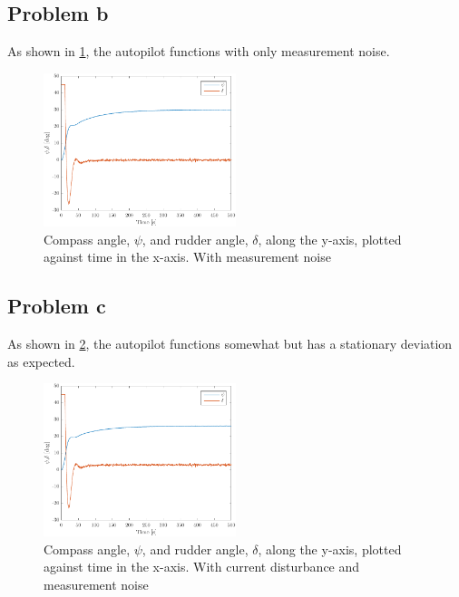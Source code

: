 \subsection{Problem b}
As shown in \cref{fig:3b-psi_and_rudder}, the autopilot functions with only measurement noise.

\begin{figure}[ht]
    \centering
    \includegraphics[width=0.5\textwidth]{images/3b-psi_and_rudder}
    \caption{Compass angle, $\psi$, and rudder angle, $\delta$, along the y-axis, plotted against time in the x-axis. With measurement noise}
    \label{fig:3b-psi_and_rudder}
\end{figure}

\subsection{Problem c}
As shown in \cref{fig:3b-psi_and_rudder_w_current}, the autopilot functions somewhat but has a stationary deviation as expected.

\begin{figure}[ht]
    \centering
    \includegraphics[width=0.5\textwidth]{images/3c-psi_and_rudder_w_current}
    \caption{Compass angle, $\psi$, and rudder angle, $\delta$, along the y-axis, plotted against time in the x-axis. With current disturbance and measurement noise}
    \label{fig:3b-psi_and_rudder_w_current}
\end{figure}

